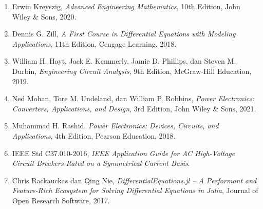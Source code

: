 \documentclass[11pt,a4paper]{article}
\theoremstyle{definition}
\begin{document}
\begin{enumerate}[leftmargin=*]
    \item Erwin Kreyszig, \textit{Advanced Engineering Mathematics}, 10th Edition, John Wiley \& Sons, 2020.
    \item Dennis G. Zill, \textit{A First Course in Differential Equations with Modeling Applications}, 11th Edition, Cengage Learning, 2018.
    \item William H. Hayt, Jack E. Kemmerly, Jamie D. Phillips, dan Steven M. Durbin, \textit{Engineering Circuit Analysis}, 9th Edition, McGraw-Hill Education, 2019.
    \item Ned Mohan, Tore M. Undeland, dan William P. Robbins, \textit{Power Electronics: Converters, Applications, and Design}, 3rd Edition, John Wiley \& Sons, 2021.
    \item Muhammad H. Rashid, \textit{Power Electronics: Devices, Circuits, and Applications}, 4th Edition, Pearson Education, 2018.
    \item IEEE Std C37.010-2016, \textit{IEEE Application Guide for AC High-Voltage Circuit Breakers Rated on a Symmetrical Current Basis}.
    \item Chris Rackauckas dan Qing Nie, \textit{DifferentialEquations.jl -- A Performant and Feature-Rich Ecosystem for Solving Differential Equations in Julia}, Journal of Open Research Software, 2017.
\end{enumerate}
\end{document}
